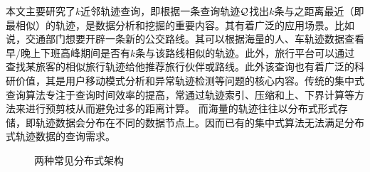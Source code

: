         本文主要研究了$k$近邻轨迹查询，即根据一条查询轨迹$\cal Q$找出$k$条与之距离最近（即最相似）的轨迹，是数据分析和挖掘的重要内容。其有着广泛的应用场景。比如说，交通部门想要开辟一条新的公交路线。其可以根据海量的人、车轨迹数据查看早/晚上下班高峰期间是否有$k$条与该路线相似的轨迹。此外，旅行平台可以通过查找某旅客的相似旅行轨迹给他推荐旅行伙伴或路线。此外该查询也有着广泛的科研价值，其是用户移动模式分析和异常轨迹检测等问题的核心内容。传统的集中式查询算法专注于查询时间效率的提高，常通过轨迹索引\cite{FrentzosGPT07,GutingBX10,KolliosGT99,RanuPTDR15,ChenSZZX10}、压缩\cite{AgrawalFS93,RafieiM02,Pelekis}和上、下界计算\cite{Skoumas,Zhao1997LINEAR}等方法来进行预剪枝从而避免过多的距离计算。  而海量的轨迹往往以分布式形式存储，即轨迹数据会分布在不同的数据节点上。因而已有的集中式算法无法满足分布式轨迹数据的查询需求。
        
            \begin{figure}
        	\centering
        	\caption{两种常见分布式架构}
        	\label{fig:DistributeArc}
        \end{figure}
        
